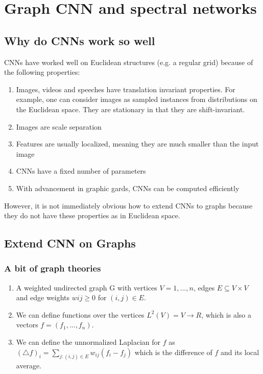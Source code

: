 \chapter{Graph CNN and spectral networks}

\section{Why do CNNs work so well} \label{section:sceneParsing}
CNNs have worked well on Euclidean structures (e.g. a regular grid) because of the following properties:
\begin{enumerate}
    \item Images, videos and speeches have translation invariant properties. For example, one can consider images as sampled instances from distributions on the Euclidean space. They are stationary in that they are shift-invariant. 
    \item Images are scale separation 
    \item Features are usually localized, meaning they are much smaller than the input image
    \item CNNs have a fixed number of parameters 
    \item With advancement in graphic gards, CNNs can be computed efficiently 
\end{enumerate}
However, it is not immediately obvious how to extend CNNs to graphs because they do not have these properties as in Euclidean space.

\section{Extend CNN on Graphs} \label{section:sceneParsing}
\subsection{A bit of graph theories}

\begin{enumerate}
    \item A weighted undirected graph G with
vertices $V = {1, . . . , n}$, edges $E \subseteq V × V$
and edge weights $wij \geq 0$ for $(i, j) \in E$. 
    \item We can define functions over the vertices $L^2(V) = {V \to R}$, which is also a vectors $f = (f_1, . . . , f_n)$.
    \item We can define the unnormalized Laplacian for $f$ as $(\bigtriangleup f)_i = \sum_{j: (i, j)\in E} w_{ij} (f_i - f_j) $ which is the difference of $f$ and its local average. 
\end{enumerate}

